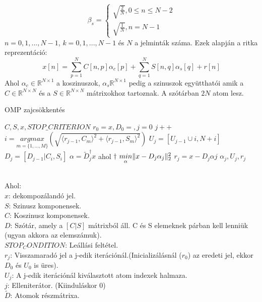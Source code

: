 \begin{equation}
    \beta_s = 
    \begin{cases}
        \sqrt{\frac{2}{N}}, 0 \leq n \leq N - 2\\
        \sqrt{\frac{1}{N}}, n = N - 1
    \end{cases}
\end{equation}
$n = {0, 1,..., N - 1}$, $k = {0, 1,..., N - 1}$ és $N$ a jelminták száma. Ezek alapján a ritka reprezentáció:
\begin{equation}
    x[n] = \sum_{p=1}^N C[n,p]\alpha_c[p] + \sum_{q=1}^N S[n,q]\alpha_s[q] + r[n]
\end{equation}
Ahol $\alpha_c \in \mathbb{R}^{N \times 1}$ a koszinuszok, $\alpha_s \mathbb{R}^{N \times 1}$ pedig a szinuszok együtthatói amik a $C \in \mathbb{R}^{N \times N}$ és a $S \in \mathbb{R}^{N \times N}$ mátrixokhoz tartoznak. A szótárban $2N$ atom lesz.\cite{noise_reduction_omp}
\\
\begin{algorithm}
    \caption{OMP zajcsökkentés}\label{alg:cap}
    \begin{algorithmic}
        \Require $C, S, x, STOP\_CRITERION$
        \Ensure $r_0 = x, D_0 = {}, j = 0$
            \State $j++$
            \State $i = \underset{m=\{1,...,M\}}{argmax}(\sqrt{\langle r_{j-1}, C_m \rangle^2 + \langle r_{j-1}, S_m \rangle^2})$  %
            \State $U_{j}=[U_{j - 1} \cup {i, N + i}]$
            \State $D_{j}=[D_{j - 1} | {C_{i}, S_i}]$
            \State $\alpha = \tilde{D}_j^{\dagger}x$ ahol $\dagger$
           \State $\underset{\alpha}{min} \lVert x - D_{j}\alpha_{j}\rVert_{2}^{2}$
          \State $r_{j} = x - D_{j}\alpha{j}$
       \EndWhile
       \State \Return $\alpha_{j}, U_{j}, r_{j}$
   \end{algorithmic} \cite{noise_reduction_omp} 
\end{algorithm}
\\
Ahol: \\
$x$: dekompozálandó jel. \\
$S$: Szinusz komponensek. \\
$C$: Koszinusz komponensek. \\
$D$: Szótár, amely a $[C|S]$ mátrixból áll. C és S elemeknek párban kell lenniük (ugyan akkora az elemszámuk).\\
$STOP_CONDITION$: Leállási feltétel. \\
$r_j$: Visszamaradó jel a j-edik iterációnál.(Inicializálásnál ($r_0$) az eredeti jel, ekkor $D_0$ és $U_0$ is üres). \\
$U_j$: A j-edik iterációnál kiválasztott atom indexek halmaza. \\
$j$: Elleniterátor. (Kiinduláskor 0) \\
$\tilde{D}$: Atomok részmátrixa. \\

